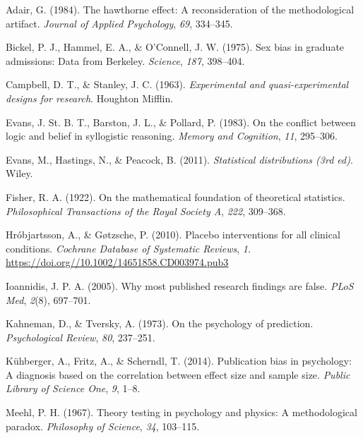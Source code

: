 \documentclass[
  letterpaper,
]{book}
\newlength{\cslhangindent}
\newlength{\cslentryspacingunit} %
\newenvironment{CSLReferences}[2] %
 {%
  \setlength{\parindent}{0pt}
  \ifodd #1
  \let\oldpar\par
  \def\par{\hangindent=\cslhangindent\oldpar}
  \fi
  \setlength{\parskip}{#2\cslentryspacingunit}
 }%
 {}
\begin{document}
\hypertarget{refs}{}
\begin{CSLReferences}{1}{0}
\leavevmode{}%
Adair, G. (1984). The hawthorne effect: A reconsideration of the
methodological artifact. \emph{Journal of Applied Psychology},
\emph{69}, 334--345.

\leavevmode{}%
Bickel, P. J., Hammel, E. A., \& O'Connell, J. W. (1975). Sex bias in
graduate admissions: Data from {B}erkeley. \emph{Science}, \emph{187},
398--404.

\leavevmode{}%
Campbell, D. T., \& Stanley, J. C. (1963). \emph{Experimental and
quasi-experimental designs for research}. Houghton Mifflin.

\leavevmode{}%
Evans, J. St. B. T., Barston, J. L., \& Pollard, P. (1983). On the
conflict between logic and belief in syllogistic reasoning. \emph{Memory
and Cognition}, \emph{11}, 295--306.

\leavevmode{}%
Evans, M., Hastings, N., \& Peacock, B. (2011). \emph{Statistical
distributions (3rd ed)}. Wiley.

\leavevmode{}%
Fisher, R. A. (1922). On the mathematical foundation of theoretical
statistics. \emph{Philosophical Transactions of the Royal Society A},
\emph{222}, 309--368.

\leavevmode{}%
Hróbjartsson, A., \& Gøtzsche, P. (2010). Placebo interventions for all
clinical conditions. \emph{Cochrane Database of Systematic Reviews},
\emph{1}. \url{https://doi.org//10.1002/14651858.CD003974.pub3}

\leavevmode{}%
Ioannidis, J. P. A. (2005). Why most published research findings are
false. \emph{PLoS Med}, \emph{2}(8), 697--701.

\leavevmode{}%
Kahneman, D., \& Tversky, A. (1973). On the psychology of prediction.
\emph{Psychological Review}, \emph{80}, 237--251.

\leavevmode{}%
Kühberger, A., Fritz, A., \& Scherndl, T. (2014). Publication bias in
psychology: A diagnosis based on the correlation between effect size and
sample size. \emph{Public Library of Science One}, \emph{9}, 1--8.

\leavevmode{}%
Meehl, P. H. (1967). Theory testing in psychology and physics: A
methodological paradox. \emph{Philosophy of Science}, \emph{34},
103--115.


\end{CSLReferences}
\end{document}
